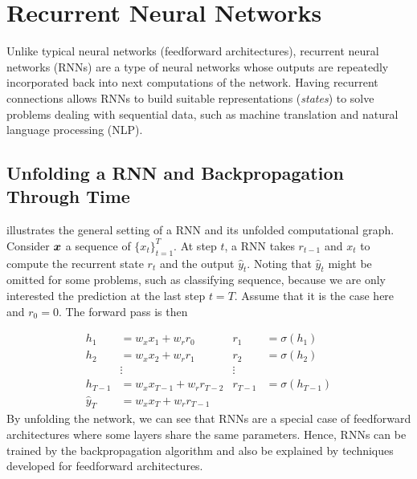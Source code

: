 \section{Recurrent Neural Networks}
Unlike typical neural networks (feedforward architectures), recurrent neural networks (RNNs) are a type of neural networks whose outputs are repeatedly incorporated back into next computations of the network. Having recurrent connections allows RNNs to build suitable representations (\textit{states}) to solve problems dealing with sequential data,  such as machine translation and natural language processing (NLP).

\subsection{Unfolding a RNN and Backpropagation Through Time}
 
\addfigure{\ref{fig:rnn_unfold}} illustrates the general setting of a RNN and its unfolded computational graph. Consider $\boldsymbol{x}$ a sequence of $\{ x_t \}_{t=1}^{T}$.  At step $t$, a RNN takes $r_{t-1}$ and $x_{t}$ to compute the recurrent state $r_{t}$ and the output $\hat{y}_t$. Noting that $\hat{y}_t$ might be omitted for some problems, such as classifying sequence, because we are only interested  the prediction at the last step $t=T$. Assume that it is the case here and $r_0 = 0$.  The forward pass is then

\begin{align*}
	h_1 &= w_{x} x_1 + w_{r} r_0 & r_1 &= \sigma(h_1)  \\
	h_2 &= w_{x} x_2 + w_{r} r_1 &  r_2 &= \sigma(h_2) \\
	& \vdots & \vdots \\
	h_{T-1} &= w_{x} x_{T-1} + w_{r} r_{T-2} &  r_{T-1} &= \sigma(h_{T-1}) \\
	\hat{y}_T &= w_{x} x_T   + w_{r} r_{T-1}
\end{align*}
By unfolding the network,  we can see that RNNs are a special case of feedforward architectures where some layers share the same parameters. Hence, RNNs can be trained by the backpropagation algorithm and also be explained by techniques developed for feedforward architectures.


%




